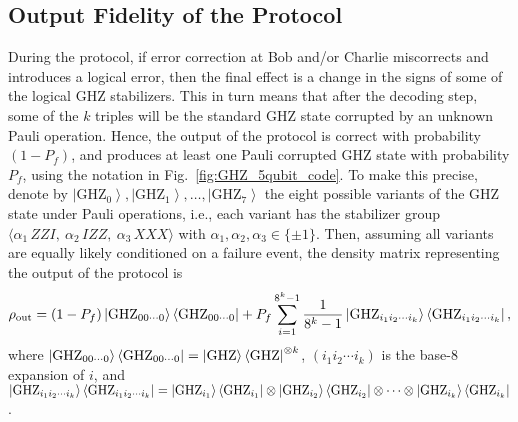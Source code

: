 \documentclass[journal,onecolumn]{IEEEtran}
\newcommand{\dket}[1]{\left\lvert #1 \right\rangle}
\begin{document}
\subsection{Output Fidelity of the Protocol}


During the protocol, if error correction at Bob and/or Charlie miscorrects and introduces a logical error, then the final effect is a change in the signs of some of the logical GHZ stabilizers.
This in turn means that after the decoding step, some of the $k$ triples will be the standard GHZ state corrupted by an unknown Pauli operation.
Hence, the output of the protocol is correct with probability $(1-P_f)$, and produces at least one Pauli corrupted GHZ state with probability $P_f$, using the notation in Fig.~\ref{fig:GHZ_5qubit_code}.
To make this precise, denote by $\dket{\text{GHZ}_0}, \dket{\text{GHZ}_1}, \ldots, \dket{\text{GHZ}_7}$ the eight possible variants of the GHZ state under Pauli operations, i.e., each variant has the stabilizer group $\langle \alpha_1 \, ZZI, \ \alpha_2 \, IZZ, \ \alpha_3 \, XXX \rangle$ with $\alpha_1, \alpha_2, \alpha_3 \in \{ \pm 1 \}$.
Then, assuming all variants are equally likely conditioned on a failure event, the density matrix representing the output of the protocol is 
\begin{align}
\rho_{\text{out}} = (1 - P_f) \dketbra{\text{GHZ}_{00\cdots 0}} + P_f \sum_{i=1}^{8^k-1} \frac{1}{8^k-1} \dketbra{\text{GHZ}_{i_1 i_2 \cdots i_k}},
\end{align}
where $\dketbra{\text{GHZ}_{00\cdots 0}} = \dketbra{\text{GHZ}}^{\otimes k}$, $(i_1 i_2 \cdots i_k)$ is the base-$8$ expansion of $i$, and $\dketbra{\text{GHZ}_{i_1 i_2 \cdots i_k}} = \dketbra{\text{GHZ}_{i_1}} \otimes \dketbra{\text{GHZ}_{i_2}} \otimes \cdots \otimes \dketbra{\text{GHZ}_{i_k}}$.
\end{document}
